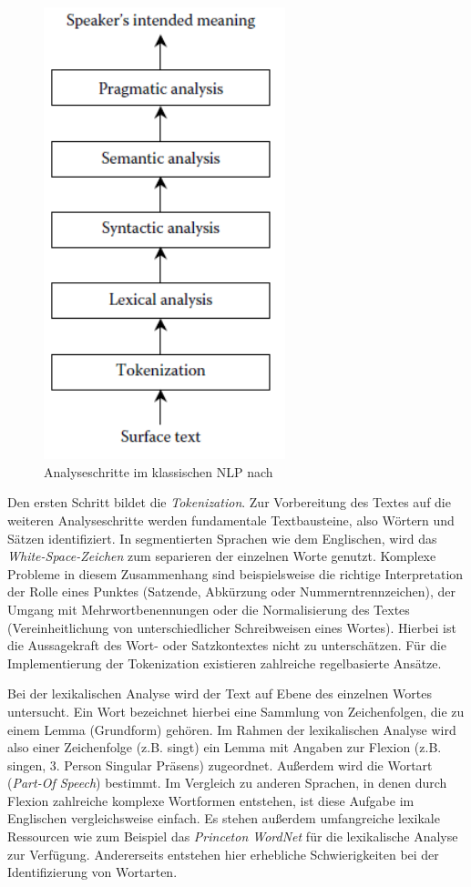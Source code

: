 \par
\begin{figure}
\includegraphics[width=7cm]{pictures/Analyseschritte.png}
\caption{Analyseschritte im klassischen NLP nach \cite[vgl.][4]{DALE}}
\label{fig:STEPS}
\end{figure}
\par
Den ersten Schritt bildet die \textit{Tokenization}. Zur Vorbereitung des Textes auf die weiteren Analyseschritte werden fundamentale Textbausteine, also Wörtern und Sätzen identifiziert. In segmentierten Sprachen wie dem Englischen, wird das \textit{White-Space-Zeichen} zum separieren der einzelnen Worte genutzt. Komplexe Probleme in diesem Zusammenhang sind beispielsweise die richtige Interpretation der Rolle eines Punktes (Satzende, Abkürzung oder Nummerntrennzeichen), der Umgang mit Mehrwortbenennungen oder die Normalisierung des Textes (Vereinheitlichung von unterschiedlicher Schreibweisen eines Wortes). Hierbei ist die Aussagekraft des Wort- oder Satzkontextes nicht zu unterschätzen. Für die Implementierung der Tokenization existieren zahlreiche regelbasierte Ansätze.
\par
Bei der lexikalischen Analyse wird der Text auf Ebene des einzelnen Wortes untersucht. Ein Wort bezeichnet hierbei eine Sammlung von Zeichenfolgen, die zu einem Lemma (Grundform) gehören. Im Rahmen der lexikalischen Analyse wird also einer Zeichenfolge (z.B. singt) ein Lemma mit Angaben zur Flexion (z.B. singen, 3. Person Singular Präsens) zugeordnet. Außerdem wird die Wortart (\textit{Part-Of Speech}) bestimmt. Im Vergleich zu anderen Sprachen, in denen durch Flexion zahlreiche komplexe Wortformen entstehen, ist diese Aufgabe im Englischen vergleichsweise einfach. Es stehen außerdem umfangreiche lexikale Ressourcen wie zum Beispiel das \textit{Princeton WordNet} für die lexikalische Analyse zur Verfügung. Andererseits entstehen hier erhebliche Schwierigkeiten bei der Identifizierung von Wortarten.
